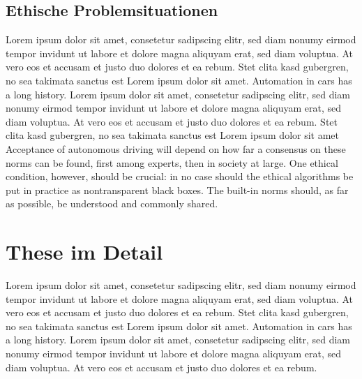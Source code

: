 \subsection{Ethische Problemsituationen}

Lorem ipsum dolor sit amet, consetetur sadipscing elitr, sed diam nonumy eirmod tempor invidunt ut labore et dolore magna aliquyam erat, sed diam voluptua. 
At vero eos et accusam et justo duo dolores et ea rebum. 
Stet clita kasd gubergren, no sea takimata sanctus est Lorem ipsum dolor sit amet. 
Automation in cars has a long history.  Lorem ipsum dolor sit amet, consetetur sadipscing elitr, sed diam nonumy eirmod tempor invidunt ut labore et dolore magna aliquyam erat, sed diam voluptua. 
At vero eos et accusam et justo duo dolores et ea rebum. 
Stet clita kasd gubergren, no sea takimata sanctus est Lorem ipsum dolor sit amet Acceptance of autonomous driving will depend on how far a consensus on these norms can be found, first among experts, then in society at large. 
One ethical condition, however, should be crucial: in no case should the ethical algorithms be put in practice as nontransparent black boxes. 
The built-in norms should, as far as possible, be understood and commonly shared.

\section{These im Detail}

Lorem ipsum dolor sit amet, consetetur sadipscing elitr, sed diam nonumy eirmod tempor invidunt ut labore et dolore magna aliquyam erat, sed diam voluptua. 
At vero eos et accusam et justo duo dolores et ea rebum. 
Stet clita kasd gubergren, no sea takimata sanctus est Lorem ipsum dolor sit amet. 
Automation in cars has a long history.  Lorem ipsum dolor sit amet, consetetur sadipscing elitr, sed diam nonumy eirmod tempor invidunt ut labore et dolore magna aliquyam erat, sed diam voluptua. 
At vero eos et accusam et justo duo dolores et ea rebum.
\newline 


